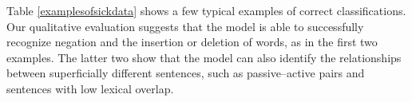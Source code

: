 

Table \ref{examplesofsickdata} shows a few typical examples of correct classifications. Our qualitative evaluation suggests that the model is able to successfully recognize negation and the insertion or deletion of words, as in the first two examples. The latter two show that the model can also identify the relationships between superficially different sentences, such as passive--active pairs and sentences with low lexical overlap.